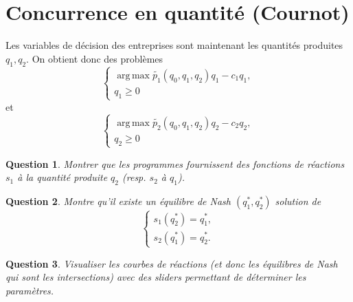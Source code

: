 \documentclass[11pt]{article}
\DeclareMathOperator*{\argmax}{arg\,max}
\newtheorem{question}{Question}
\begin{document}
\section{Concurrence en quantité (Cournot)}%
\label{sec:concurrence_en_quantite}

Les variables de décision des entreprises sont maintenant les quantités produites $q_1, q_2$.
On obtient donc des problèmes
\begin{equation} \label{eq:9}
    \begin{cases}
        \argmax \tilde{p_1}(q_0, q_1, q_2) q_1 - c_1 q_1,\\
        q_1 \geq 0
    \end{cases}
\end{equation}
et 
\begin{equation} \label{eq:10}
    \begin{cases}
        \argmax \tilde{p_2}(q_0, q_1, q_2) q_2 - c_2 q_2,\\
        q_2 \geq 0
    \end{cases}
\end{equation}
\begin{question}
Montrer que les programmes fournissent des fonctions de réactions $s_1$ à la quantité produite $q_2$ (resp. $s_2$ à $q_1$).
\end{question}

\begin{question}
    Montre qu'il existe un équilibre de Nash $(q_1^*, q_2^*)$ solution de 
    \begin{equation} \label{eq:11}
        \begin{cases}
            s_1(q_2^*)=q_1^*,\\
            s_2(q_1^*)=q_2^*.
        \end{cases}
    \end{equation}
\end{question}

\begin{question}
    Visualiser les courbes de réactions (et donc les équilibres de Nash qui sont les intersections) avec des sliders permettant de déterminer les paramètres.
\end{question}
\end{document}
